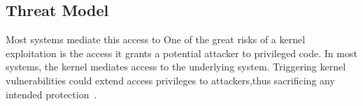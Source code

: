 

\subsection{Threat Model}

Most systems mediate this access to
One of the great risks of a kernel exploitation is the access
it grants a potential attacker to privileged code. In most systems, the kernel
mediates access to the underlying system. Triggering kernel vulnerabilities
could extend access privileges
to attackers,thus sacrificing any intended protection~\cite{Repy-10}.


